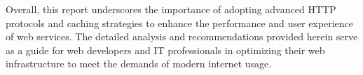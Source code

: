\documentclass[a4paper,10pt]{article}
\begin{document}
Overall, this report underscores the importance of adopting advanced HTTP protocols and caching strategies to enhance the performance and user experience of web services. The detailed analysis and recommendations provided herein serve as a guide for web developers and IT professionals in optimizing their web infrastructure to meet the demands of modern internet usage.

\end{document}
